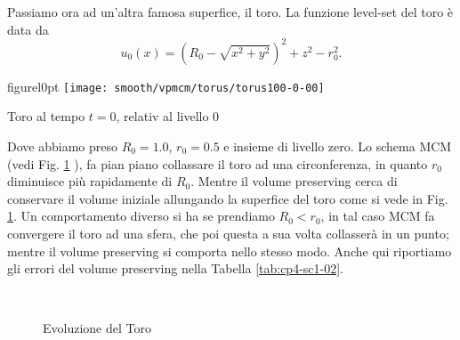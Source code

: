 \newpage
Passiamo ora ad un'altra famosa superfice, il toro. La funzione
level-set del toro è data da
\[
u_0(x) = \left(R_0-\sqrt{x^2+y^2}\right)^2+z^2-r_0^2.
\]

\begin{wrapfloat}{figure}{l}{0pt}
\texttt{[image: smooth/vpmcm/torus/torus100-0-00]}
\caption{Toro al tempo $t=0$, relativ al livello $0$}
\end{wrapfloat}

Dove abbiamo preso $R_0=1.0$, $r_0=0.5$ e insieme di livello zero. Lo
schema MCM (vedi Fig. \ref{fig:cp4-sc1-02} ), fa pian piano collassare
il toro ad una circonferenza, in quanto $r_0$ diminuisce più rapidamente di
$R_0$.  Mentre il volume preserving cerca di conservare il volume
iniziale  allungando la superfice del toro come si vede in
Fig. \ref{fig:cp4-sc1-02}. Un comportamento diverso si ha se
prendiamo $R_0<r_0$, in tal caso MCM  fa convergere il toro ad una
sfera, che poi questa a sua volta collasserà in un punto; mentre il
volume preserving si comporta nello stesso modo. Anche qui riportiamo
gli errori del volume preserving nella Tabella \ref{tab:cp4-sc1-02}.

\begin{figure}[htb!]
  \centering
  \quad
  \\
  \quad
  \quad
  \caption{Evoluzione del Toro}
  \label{fig:cp4-sc1-02}
\end{figure}

